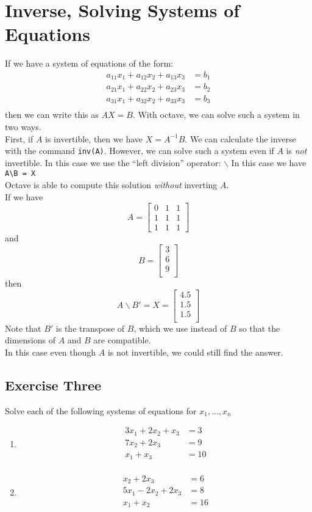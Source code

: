 \documentclass{article}
\begin{document}
\section{Inverse, Solving Systems of Equations}
If we have a system of equations of the form:
\begin{align*}
a_{11}x_1+a_{12}x_2 + a_{13}x_3 &= b_1 \\
a_{21}x_1+a_{22}x_2 + a_{23}x_3 &= b_2 \\
a_{31}x_1+a_{32}x_2 + a_{33}x_3 &= b_3 \\
\end{align*}
then we can write this as $AX = B$.  With octave, we can solve such a system in two ways.
\\First, if $A$ is invertible, then we have $X=A^{-1}B$.  We can calculate the inverse with the command \verb|inv(A)|.  However, we can solve such a system even if $A$ is \emph{not} invertible.  In this case we use the ``left division'' operator: $\backslash$  In this case we have \verb|A\B = X|  
\\Octave is able to compute this solution \emph{without} inverting $A$.\\
If we have
\[A =
\left[
\begin{array}{ccc}
0 & 1 & 1\\
1 & 1 & 1 \\
1 & 1 & 1
 \end{array}
 \right]
\]
and
\[B =
\left[
\begin{array}{c}
3\\
6\\ 
9\\ 
 \end{array}
 \right]
\]
then 
\[A\backslash B'= X =
\left[
\begin{array}{c}
4.5\\ 
1.5\\ 
1.5\\ 
 \end{array}
 \right]
\]
Note that $B'$ is the transpose of $B$, which we use instead of $B$ so that the dimensions of $A$ and $B$ are compatible. 
\\In this case even though $A$ is not invertible, we could still find the answer.
\subsection{Exercise Three}
Solve each of the following systems of equations for $x_1, \ldots ,x_n$
\begin{enumerate}
\item
  \begin{align*}
    3x_1 + 2x_2 + x_3 &= 3 \\
           7x_2 + 2x_3 &= 9 \\
    x_1 + x_3 &= 10 \\
  \end{align*}
\item
  \begin{align*}
           x_2 + 2x_3 &= 6 \\
    5x_1 - 2x_2 + 2x_3 &= 8 \\
    x_1 + x_2 &= 16 \\
  \end{align*}
\end{enumerate}
\newpage{}
\end{document}
